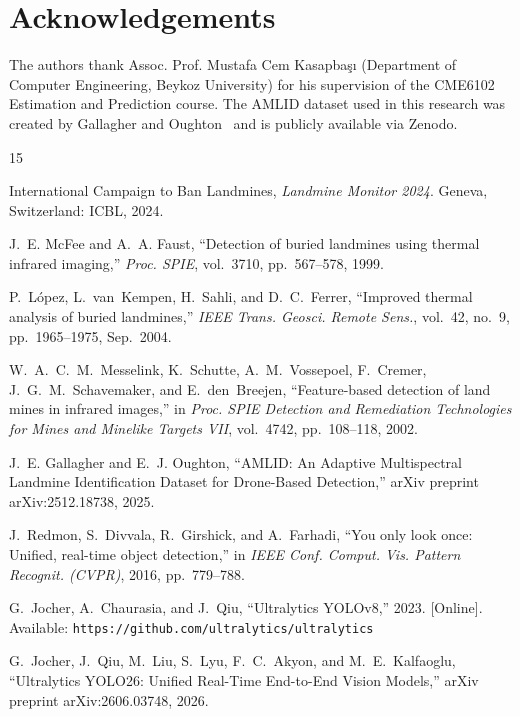 \documentclass[conference]{IEEEtran}
\begin{document}
\section*{Acknowledgements}

The authors thank Assoc. Prof. Mustafa Cem Kasapba\c{s}{\i} (Department of Computer Engineering, Beykoz University) for his supervision of the CME6102 Estimation and Prediction course. The AMLID dataset used in this research was created by Gallagher and Oughton~\cite{gallagher2025} and is publicly available via Zenodo.

\begin{thebibliography}{15}

International Campaign to Ban Landmines, \emph{Landmine Monitor 2024}. Geneva, Switzerland: ICBL, 2024.

J.~E. McFee and A.~A. Faust, ``Detection of buried landmines using thermal infrared imaging,'' \emph{Proc. SPIE}, vol.~3710, pp.~567--578, 1999.

P.~L\'{o}pez, L.~van~Kempen, H.~Sahli, and D.~C.~Ferrer, ``Improved thermal analysis of buried landmines,'' \emph{IEEE Trans. Geosci. Remote Sens.}, vol.~42, no.~9, pp.~1965--1975, Sep.~2004.

W.~A.~C.~M.~Messelink, K.~Schutte, A.~M.~Vossepoel, F.~Cremer, J.~G.~M.~Schavemaker, and E.~den~Breejen, ``Feature-based detection of land mines in infrared images,'' in \emph{Proc. SPIE Detection and Remediation Technologies for Mines and Minelike Targets VII}, vol.~4742, pp.~108--118, 2002.

J.~E. Gallagher and E.~J. Oughton, ``AMLID: An Adaptive Multispectral Landmine Identification Dataset for Drone-Based Detection,'' arXiv preprint arXiv:2512.18738, 2025.

J.~Redmon, S.~Divvala, R.~Girshick, and A.~Farhadi, ``You only look once: Unified, real-time object detection,'' in \emph{IEEE Conf. Comput. Vis. Pattern Recognit. (CVPR)}, 2016, pp.~779--788.

G.~Jocher, A.~Chaurasia, and J.~Qiu, ``Ultralytics YOLOv8,'' 2023. [Online]. Available: \texttt{https://github.com/ultralytics/ultralytics}

G.~Jocher, J.~Qiu, M.~Liu, S.~Lyu, F.~C.~Akyon, and M.~E.~Kalfaoglu, ``Ultralytics YOLO26: Unified Real-Time End-to-End Vision Models,'' arXiv preprint arXiv:2606.03748, 2026.


\end{thebibliography}
\end{document}
